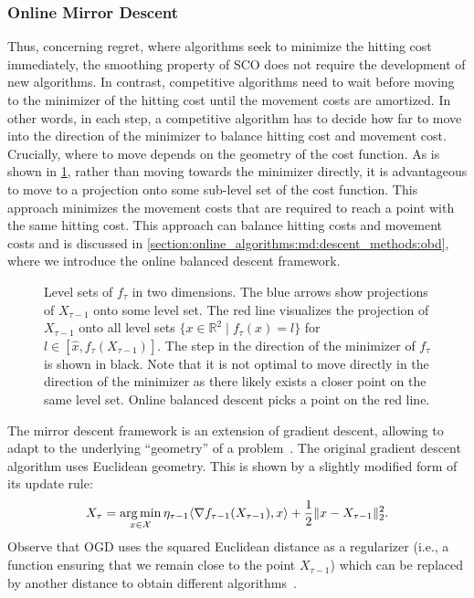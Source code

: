 \subsubsection{Online Mirror Descent}\label{section:online_algorithms:md:descent_methods:omd}

Thus, concerning regret, where algorithms seek to minimize the hitting cost immediately, the smoothing property of SCO does not require the development of new algorithms. In contrast, competitive algorithms need to wait before moving to the minimizer of the hitting cost until the movement costs are amortized. In other words, in each step, a competitive algorithm has to decide how far to move into the direction of the minimizer to balance hitting cost and movement cost. Crucially, where to move depends on the geometry of the cost function. As is shown in \cref{fig:level_sets_of_the_hitting_costs}, rather than moving towards the minimizer directly, it is advantageous to move to a projection onto some sub-level set of the cost function. This approach minimizes the movement costs that are required to reach a point with the same hitting cost. This approach can balance hitting costs and movement costs and is discussed in \cref{section:online_algorithms:md:descent_methods:obd}, where we introduce the online balanced descent framework.

\begin{figure}
    \centering
    
    \caption{Level sets of $f_{\tau}$ in two dimensions. The blue arrows show projections of $X_{\tau-1}$ onto some level set. The red line visualizes the projection of $X_{\tau-1}$ onto all level sets $\{x \in \mathbb{R}^2 \mid f_{\tau}(x) = l\}$ for $l \in [\hat{x}, f_{\tau}(X_{\tau-1})]$. The step in the direction of the minimizer of $f_{\tau}$ is shown in black. Note that it is not optimal to move directly in the direction of the minimizer as there likely exists a closer point on the same level set. Online balanced descent picks a point on the red line.}
    \label{fig:level_sets_of_the_hitting_costs}
\end{figure}

The mirror descent framework is an extension of gradient descent, allowing to adapt to the underlying ``geometry'' of a problem~\cite{Gupta2020}. The original gradient descent algorithm uses Euclidean geometry. This is shown by a slightly modified form of its update rule: \begin{align*}
    X_{\tau} = \operatorname*{arg\,min}_{x \in \mathcal{X}} \eta_{\tau-1} \langle\nabla f_{\tau-1}(X_{\tau-1}), x\rangle + \frac{1}{2} \lVert x - X_{\tau-1}\rVert_2^2.
\end{align*} Observe that OGD uses the squared Euclidean distance as a regularizer (i.e., a function ensuring that we remain close to the point $X_{\tau-1}$) which can be replaced by another distance to obtain different algorithms~\cite{Gupta2020}.

